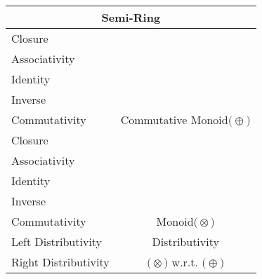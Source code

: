 \documentclass[a4paper,12pt]{scrartcl}
\newcommand{\OpA}{\otimes}
\newcommand{\OpB}{\oplus}
\begin{document}
\begin{minipage}[c]{0,5\textwidth}
\vspace{0.6cm}
\begin{tabular}{|l|c|} %
  \hline
  \multicolumn{2}{c}{\cellcolor{green!25}Semi-Ring} \\
  \hline
    \cellcolor{blue!25} Closure& \cellcolor{yellow!25}  \\
    \cellcolor{blue!25} Associativity& \cellcolor{yellow!25}  \\
    \cellcolor{blue!25} Identity& \cellcolor{yellow!25} \\
    \cellcolor{red!25} Inverse& \cellcolor{yellow!25} \\
    \cellcolor{blue!25} Commutativity& \multirow{-5}{*}{\tiny\cellcolor{yellow!25}Commutative Monoid$\big(\OpB\big)$} \\
   \hline
    \cellcolor{blue!25} Closure& \cellcolor{yellow!25}  \\
    \cellcolor{blue!25} Associativity& \cellcolor{yellow!25}  \\
    \cellcolor{blue!25} Identity& \cellcolor{yellow!25} \\
    \cellcolor{red!25} Inverse& \cellcolor{yellow!25} \\
    \cellcolor{red!25} Commutativity& \multirow{-5}{*}{\tiny\cellcolor{yellow!25}Monoid$\big(\OpA\big)$} \\
  \hline
  	\cellcolor{blue!25} Left Distributivity&  \tiny\cellcolor{yellow!25}Distributivity\\
    \cellcolor{blue!25} Right Distributivity & \tiny\cellcolor{yellow!25} $\big(\OpA\big)$ w.r.t. $\big(\OpB\big)$  \\
   \hline
\end{tabular}


\end{minipage}
\end{document}
